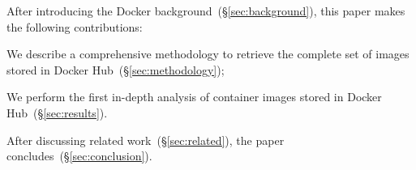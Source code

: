 %

After introducing the Docker background~(\S\ref{sec:background}),
this paper makes the following contributions:
\begin{compactenumerate}
  \item We describe a comprehensive methodology to retrieve the complete set of
  	images stored in Docker Hub~(\S\ref{sec:methodology});
  \item We perform the first in-depth analysis of container images stored in
    Docker Hub~(\S\ref{sec:results}).
\end{compactenumerate}

After discussing related work~(\S\ref{sec:related}),
the paper concludes~(\S\ref{sec:conclusion}).

